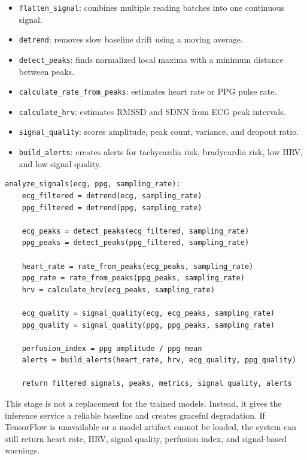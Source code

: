 \begin{itemize}
    \item \texttt{flatten\_signal}: combines multiple reading batches into one continuous signal.
    \item \texttt{detrend}: removes slow baseline drift using a moving average.
    \item \texttt{detect\_peaks}: finds normalized local maxima with a minimum distance between peaks.
    \item \texttt{calculate\_rate\_from\_peaks}: estimates heart rate or PPG pulse rate.
    \item \texttt{calculate\_hrv}: estimates RMSSD and SDNN from ECG peak intervals.
    \item \texttt{signal\_quality}: scores amplitude, peak count, variance, and dropout ratio.
    \item \texttt{build\_alerts}: creates alerts for tachycardia risk, bradycardia risk, low HRV, and low signal quality.
\end{itemize}

\begin{lstlisting}[caption={Pseudocode for signal-processing metrics}]
analyze_signals(ecg, ppg, sampling_rate):
    ecg_filtered = detrend(ecg, sampling_rate)
    ppg_filtered = detrend(ppg, sampling_rate)

    ecg_peaks = detect_peaks(ecg_filtered, sampling_rate)
    ppg_peaks = detect_peaks(ppg_filtered, sampling_rate)

    heart_rate = rate_from_peaks(ecg_peaks, sampling_rate)
    ppg_rate = rate_from_peaks(ppg_peaks, sampling_rate)
    hrv = calculate_hrv(ecg_peaks, sampling_rate)

    ecg_quality = signal_quality(ecg, ecg_peaks, sampling_rate)
    ppg_quality = signal_quality(ppg, ppg_peaks, sampling_rate)

    perfusion_index = ppg amplitude / ppg mean
    alerts = build_alerts(heart_rate, hrv, ecg_quality, ppg_quality)

    return filtered signals, peaks, metrics, signal quality, alerts
\end{lstlisting}

This stage is not a replacement for the trained models. Instead, it gives the inference service a reliable baseline and creates graceful degradation. If TensorFlow is unavailable or a model artifact cannot be loaded, the system can still return heart rate, HRV, signal quality, perfusion index, and signal-based warnings.

